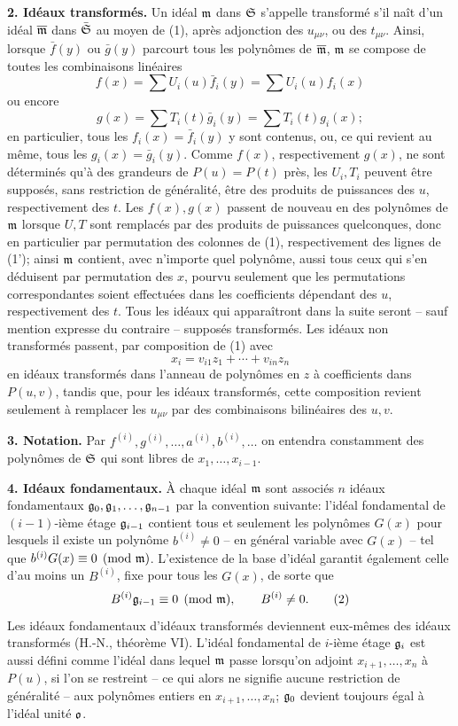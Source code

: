 \textbf{2. Idéaux transformés.} Un idéal $\mathfrak m$ dans $\mathfrak S$ s'appelle transformé s'il naît d'un idéal $\overline{\mathfrak m}$ dans $\bar{\mathfrak S}$ au moyen de (1), après adjonction des $u_{\mu\nu}$, ou des $t_{\mu\nu}$. Ainsi, lorsque $\bar f(y)$ ou $\bar g(y)$ parcourt tous les polynômes de $\overline{\mathfrak m}$, $\mathfrak m$ se compose de toutes les combinaisons linéaires
\[
 f(x)=\sum U_i(u)\bar f_i(y)=\sum U_i(u)f_i(x)
\]
ou encore
\[
 g(x)=\sum T_i(t)\bar g_i(y)=\sum T_i(t)g_i(x);
\]
en particulier, tous les $f_i(x)=\bar f_i(y)$ y sont contenus, ou, ce qui revient au même, tous les $g_i(x)=\bar g_i(y)$. Comme $f(x)$, respectivement $g(x)$, ne sont déterminés qu'à des grandeurs de $P(u)=P(t)$ près, les $U_i,T_i$ peuvent être supposés, sans restriction de généralité, être des produits de puissances des $u$, respectivement des $t$. Les $f(x),g(x)$ passent de nouveau en des polynômes de $\mathfrak m$ lorsque $U,T$ sont remplacés par des produits de puissances quelconques, donc en particulier par permutation des colonnes de (1), respectivement des lignes de (1'); ainsi $\mathfrak m$ contient, avec n'importe quel polynôme, aussi tous ceux qui s'en déduisent par permutation des $x$, pourvu seulement que les permutations correspondantes soient effectuées dans les coefficients dépendant des $u$, respectivement des $t$. Tous les idéaux qui apparaîtront dans la suite seront -- sauf mention expresse du contraire -- supposés transformés. Les idéaux non transformés passent, par composition de (1) avec
\[
 x_i=v_{i1}z_1+\cdots+v_{in}z_n
\]
en idéaux transformés dans l'anneau de polynômes en $z$ à coefficients dans $P(u,v)$, tandis que, pour les idéaux transformés, cette composition revient seulement à remplacer les $u_{\mu\nu}$ par des combinaisons bilinéaires des $u,v$.

\textbf{3. Notation.} Par $f^{(i)},g^{(i)},\ldots,a^{(i)},b^{(i)},\ldots$ on entendra constamment des polynômes de $\mathfrak S$ qui sont libres de $x_1,\ldots,x_{i-1}$.

\textbf{4. Idéaux fondamentaux.} À chaque idéal $\mathfrak m$ sont associés $n$ idéaux fondamentaux $\mathfrak g_0,\mathfrak g_1,\ldots,\mathfrak g_{n-1}$ par la convention suivante: l'idéal fondamental de $(i-1)$-ième étage $\mathfrak g_{i-1}$ contient tous et seulement les polynômes $G(x)$ pour lesquels il existe un polynôme $b^{(i)}\ne 0$ -- en général variable avec $G(x)$ -- tel que $b^{(i)}G(x)\equiv 0\pmod{\mathfrak m}$. L'existence de la base d'idéal garantit également celle d'au moins un $B^{(i)}$, fixe pour tous les $G(x)$, de sorte que
\begin{equation}
 B^{(i)}\mathfrak g_{i-1}\equiv0\pmod{\mathfrak m},\qquad B^{(i)}\ne0 . \tag{2}
\end{equation}
Les idéaux fondamentaux d'idéaux transformés deviennent eux-mêmes des idéaux transformés (H.-N., théorème VI). L'idéal fondamental de $i$-ième étage $\mathfrak g_i$ est aussi défini comme l'idéal dans lequel $\mathfrak m$ passe lorsqu'on adjoint $x_{i+1},\ldots,x_n$ à $P(u)$, si l'on se restreint -- ce qui alors ne signifie aucune restriction de généralité -- aux polynômes entiers en $x_{i+1},\ldots,x_n$; $\mathfrak g_0$ devient toujours égal à l'idéal unité $\mathfrak o$.

